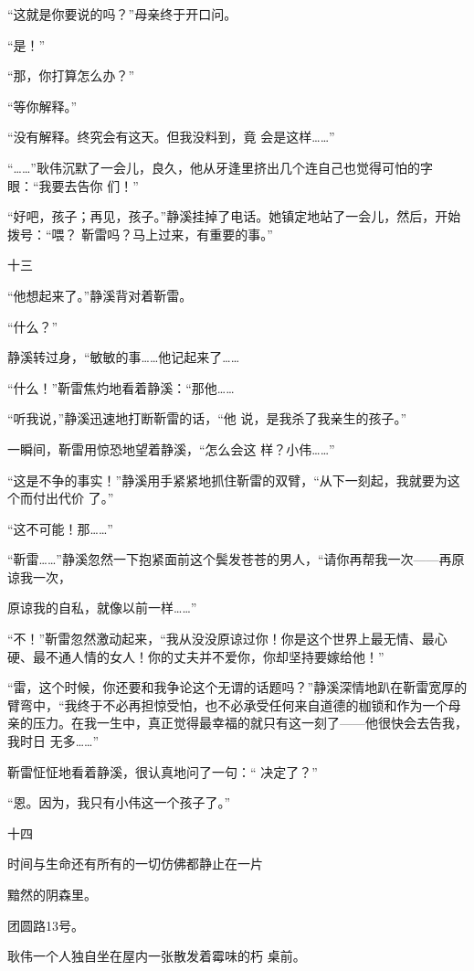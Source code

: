 \documentclass{article}
\begin{document}
\newpage

“这就是你要说的吗？”母亲终于开口问。 


“是！” 


“那，你打算怎么办？” 


“等你解释。” 

“没有解释。终究会有这天。但我没料到，竟
会是这样……” 

“……”耿伟沉默了一会儿，良久，他从牙逢里挤出几个连自己也觉得可怕的字眼：“我要去告你
们！” 

“好吧，孩子；再见，孩子。”静溪挂掉了电话。她镇定地站了一会儿，然后，开始拨号：“喂？
靳雷吗？马上过来，有重要的事。” 


十三 


\newpage

“他想起来了。”静溪背对着靳雷。 


“什么？” 

静溪转过身，“敏敏的事……他记起来了……

“什么！”靳雷焦灼地看着静溪：“那他……

“听我说，”静溪迅速地打断靳雷的话，“他
说，是我杀了我亲生的孩子。” 

一瞬间，靳雷用惊恐地望着静溪，“怎么会这
样？小伟……” 

“这是不争的事实！”静溪用手紧紧地抓住靳雷的双臂，“从下一刻起，我就要为这个而付出代价
了。” 


“这不可能！那……” 

“靳雷……”静溪忽然一下抱紧面前这个鬓发苍苍的男人，“请你再帮我一次——再原谅我一次，
\newpage

原谅我的自私，就像以前一样……” 

“不！”靳雷忽然激动起来，“我从没没原谅过你！你是这个世界上最无情、最心硬、最不通人情的女人！你的丈夫并不爱你，你却坚持要嫁给他！”

“雷，这个时候，你还要和我争论这个无谓的话题吗？”静溪深情地趴在靳雷宽厚的臂弯中，“我终于不必再担惊受怕，也不必承受任何来自道德的枷锁和作为一个母亲的压力。在我一生中，真正觉得最幸福的就只有这一刻了——他很快会去告我，我时日
无多……” 

靳雷怔怔地看着静溪，很认真地问了一句：“
决定了？” 


“恩。因为，我只有小伟这一个孩子了。” 


十四 

时间与生命还有所有的一切仿佛都静止在一片
\newpage

黯然的阴森里。 


团圆路13号。 

耿伟一个人独自坐在屋内一张散发着霉味的朽
桌前。 
\end{document}
